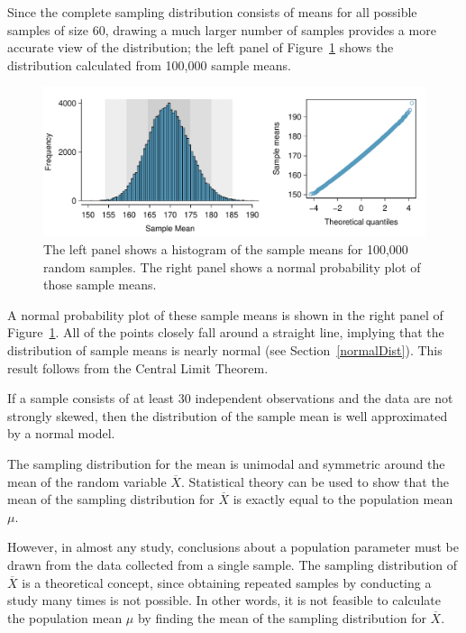 Since the complete sampling distribution consists of means for all possible samples of size 60, drawing a much larger number of samples provides a more accurate view of the distribution; the left panel of Figure~\ref{cdcWeightBigSampDist} shows the distribution calculated from 100,000 sample means. 

\begin{figure}[hht]
 	\centering
 	\includegraphics[width=\textwidth]
 	{ch_inference_foundations_oi_biostat/figures/cdcWeightBigSampDist/cdcWeightBigSampDist.pdf}
 	\caption{The left panel shows a histogram of the sample means for 100,000 random samples. The right panel shows a normal probability plot of those sample means.}
 	\label{cdcWeightBigSampDist}
\end{figure}
 
A normal probability plot of these sample means is shown in the right panel of Figure~\ref{cdcWeightBigSampDist}. All of the points closely fall around a straight line, implying that the distribution of sample means is nearly normal (see Section~\ref{normalDist}). This result follows from the Central Limit Theorem.
 
 \begin{termBox}{
 		If a sample consists of at least 30 independent observations and the data are not strongly skewed, then the distribution of the sample mean is well approximated by a normal model.}
 \end{termBox}

The sampling distribution for the mean is unimodal and symmetric around the mean of the random variable $\overline{X}$. Statistical theory can be used to show that the mean of the sampling distribution for $\overline{X}$ is exactly equal to the population mean $\mu$. 

However, in almost any study, conclusions about a population parameter must be drawn from the data collected from a single sample. The sampling distribution of $\overline{X}$ is a theoretical concept, since obtaining repeated samples by conducting a study many times is not possible. In other words, it is not feasible to calculate the population mean $\mu$ by finding the mean of the sampling distribution for $\overline{X}$.

